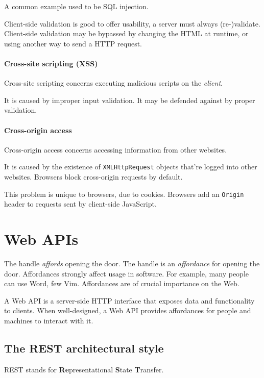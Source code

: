 \documentclass{report}
\begin{document}
A common example used to be SQL injection.

Client-side validation is good to offer usability,
a server must always (re-)validate.
Client-side validation may be bypassed by
changing the HTML at runtime,
or using another way to send a HTTP request.

\subsubsection{Cross-site scripting (XSS)}

Cross-site scripting concerns executing
malicious scripts on the \emph{client}.

It is caused by improper input validation.
It may be defended against by proper validation.

\subsubsection{Cross-origin access}

Cross-origin access concerns accessing
information from other websites.

It is caused by the existence of \texttt{XMLHttpRequest}
objects that're logged into other websites.
Browsers block cross-origin requests by default.

This problem is unique to browsers, due to cookies.
Browsers add an \texttt{Origin} header
to requests sent by client-side JavaScript.

\chapter{Web APIs}

The handle \textit{affords} opening the door.
The handle is an \textit{affordance} for opening the door.
Affordances strongly affect usage in software.
For example, many people can use Word, few Vim.
Affordances are of crucial importance on the Web.

A Web API is a server-side HTTP interface
that exposes data and functionality to clients.
When well-designed, a Web API provides affordances
for people and machines to interact with it.

\section{The REST architectural style}

REST stands for
\textbf{Re}presentational \textbf{S}tate \textbf{T}ransfer.
\end{document}
